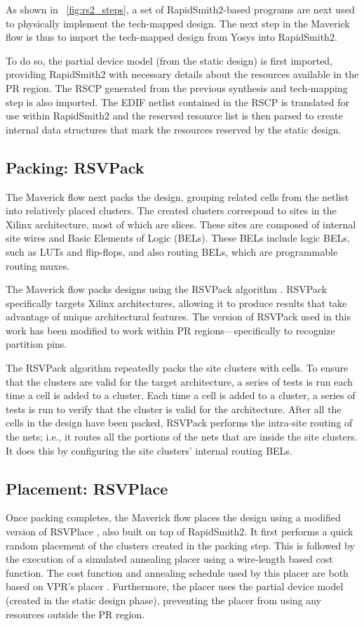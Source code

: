 As shown in \figurename~\ref{fig:rs2_steps}, a set of RapidSmith2-based programs are next used to physically implement the tech-mapped design.
The next step in the Maverick flow is thus to import the tech-mapped design from Yosys into RapidSmith2.

To do so, the partial device model (from the static design) is first imported, providing RapidSmith2 with necessary details about the resources available in the PR region. 
The RSCP generated from the previous synthesis and tech-mapping step is also imported.
The EDIF netlist contained in the RSCP is translated for use within RapidSmith2 and the reserved resource list is then parsed to create internal data structures that mark the resources reserved by the static design.

\subsection{Packing: RSVPack}
The Maverick flow next packs the design, grouping related cells from the netlist into relatively placed clusters.
The created clusters correspond to sites in the Xilinx architecture, most of which are slices.
These sites are composed of internal site wires and Basic Elements of Logic (BELs).
These BELs include logic BELs, such as LUTs and flip-flops, and also routing BELs, which are programmable routing muxes.

The Maverick flow packs designs using the RSVPack algorithm \cite{Haroldsen:2016}.
RSVPack specifically targets Xilinx architectures, allowing it to produce results that take advantage of unique architectural features.
The version of RSVPack used in this work has been modified to work within PR regions---specifically to recognize partition pins.

The RSVPack algorithm repeatedly packs the site clusters with cells. 
To ensure that the clusters are valid for the target architecture, a series of tests is run each time a cell is added to a cluster.
Each time a cell is added to a cluster, a series of tests is run to verify that the cluster is valid for the architecture.
After all the cells in the design have been packed, RSVPack performs the intra-site routing of the nets; i.e., it routes all the portions of the nets that are inside the site clusters.
It does this by configuring the site clusters' internal routing BELs.

\subsection{Placement: RSVPlace}
Once packing completes, the Maverick flow places the design using a modified version of RSVPlace \cite{Haroldsen:2016}, also built on top of RapidSmith2. 
It first performs a quick random placement of the clusters created in the packing step.
This is followed by the execution of a simulated annealing placer using a wire-length based cost function.
The cost function and annealing schedule used by this placer are both based on VPR's placer \cite{Betz:1997}.
Furthermore, the placer uses the partial device model (created in the static design phase), preventing the placer from using any resources outside the PR region.

